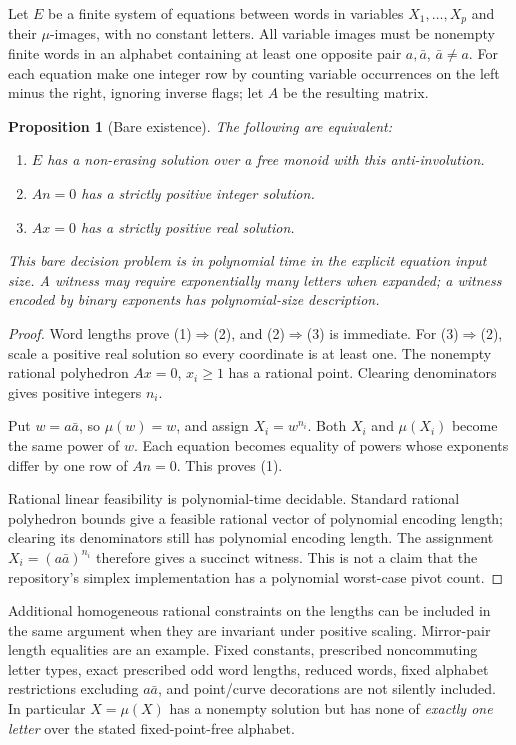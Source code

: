 \documentclass[11pt]{article}
\newtheorem{proposition}{Proposition}
\begin{document}
Let $E$ be a finite system of equations between words in variables
$X_1,\ldots,X_p$ and their $\mu$-images, with no constant letters. All
variable images must be nonempty finite words in an alphabet containing at
least one opposite pair $a,\bar a$, $\bar a\ne a$.
For each equation make one integer row by counting variable occurrences on
the left minus the right, ignoring inverse flags; let $A$ be the resulting
matrix.

\begin{proposition}[Bare existence]\label{prop:bare}
The following are equivalent:
\begin{enumerate}
\item $E$ has a non-erasing solution over a free monoid with this anti-involution.
\item $A n=0$ has a strictly positive integer solution.
\item $A x=0$ has a strictly positive real solution.
\end{enumerate}
This bare decision problem is in polynomial time in the explicit equation
input size. A witness may require exponentially many letters when expanded;
a witness encoded by binary exponents has polynomial-size description.
\end{proposition}

\begin{proof}
Word lengths prove (1)$\Rightarrow$(2), and (2)$\Rightarrow$(3) is immediate.
For (3)$\Rightarrow$(2), scale a positive real solution so every coordinate
is at least one. The nonempty rational polyhedron $A x=0$, $x_i\geq1$
has a rational point. Clearing denominators gives positive integers $n_i$.

Put $w=a\bar a$, so $\mu(w)=w$, and assign $X_i=w^{n_i}$. Both $X_i$
and $\mu(X_i)$ become the same power of $w$. Each equation becomes equality
of powers whose exponents differ by one row of $A n=0$. This proves (1).

Rational linear feasibility is polynomial-time decidable. Standard rational
polyhedron bounds give a feasible rational vector of polynomial encoding
length; clearing its denominators still has polynomial encoding length.
The assignment $X_i=(a\bar a)^{n_i}$ therefore gives a succinct witness.
This is not a claim that the repository's simplex implementation has a
polynomial worst-case pivot count.
\end{proof}

Additional homogeneous rational constraints on the lengths can be included in
the same argument when they are invariant under positive scaling. Mirror-pair
length equalities are an example. Fixed constants, prescribed noncommuting
letter types, exact prescribed odd word lengths, reduced words, fixed alphabet
restrictions excluding $a\bar a$, and point/curve decorations are not silently
included. In particular $X=\mu(X)$ has a nonempty solution but has none of
\emph{exactly one letter} over the stated fixed-point-free alphabet.
\end{document}
